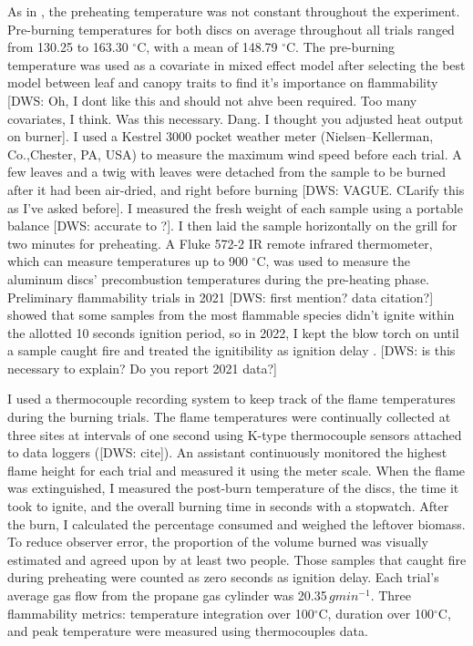 \documentclass[12pt]{report}
\begin{document}
As in \citep{wyse2016quantitative}, the preheating temperature was not constant throughout the experiment. Pre-burning temperatures for both discs on average throughout all trials ranged from 130.25 to 163.30 $^{\circ}$C, with a mean of 148.79 $^{\circ}$C. The pre-burning temperature was used as a covariate in mixed effect model after selecting the best model between leaf and canopy traits to find it's importance on flammability [DWS: Oh, I dont like this and should not ahve been required. Too many covariates, I think. Was this necessary. Dang. I thought you adjusted heat output on burner]. I used a Kestrel 3000 pocket weather meter (Nielsen–Kellerman, Co.,Chester, PA, USA) to measure the maximum wind speed before each trial. A few leaves and a twig with leaves were detached from the sample to be burned after it had been air-dried, and right before burning [DWS: VAGUE. CLarify this as I've asked before]. I measured the fresh weight of each sample using a portable balance [DWS: accurate to ?]. I then laid the sample horizontally on the grill for two minutes for preheating. A Fluke 572-2 IR remote infrared thermometer, which can measure temperatures up to 900 $^{\circ}$C, was used to measure the aluminum discs' precombustion temperatures during the pre-heating phase. Preliminary flammability trials in 2021 [DWS: first mention? data citation?] showed that some samples from the most flammable species didn't ignite within the allotted 10 seconds ignition period, so in 2022, I kept the blow torch on until a sample caught fire and treated the ignitibility as ignition delay \citep{anderson1970forest}.  [DWS: is this necessary to explain? Do you report 2021 data?]

I used a thermocouple recording system to keep track of the flame temperatures during the burning trials. The flame temperatures were continually collected at three sites at intervals of one second using K-type thermocouple sensors attached to data loggers ([DWS: cite]). An assistant continuously monitored the highest flame height for each trial and measured it using the meter scale. When the flame was extinguished, I measured the post-burn temperature of the discs, the time it took to ignite, and the overall burning time in seconds with a stopwatch. After the burn, I calculated the percentage consumed and weighed the leftover biomass. To reduce observer error, the proportion of the volume burned was visually estimated and agreed upon by at least two people. Those samples that caught fire during preheating were counted as zero seconds as ignition delay. Each trial's average gas flow from the propane gas cylinder was 20.35\,$g min^{-1}$. Three flammability metrics: temperature integration over 100$^{\circ}$C, duration over 100$^{\circ}$C, and peak temperature were measured using thermocouples data.
\end{document}
